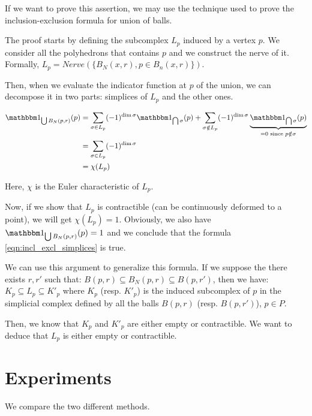 If we want to prove this assertion, we may use the technique used to prove the
inclusion-exclusion formula for union of balls.

The proof starts by defining the subcomplex $ L_p $ induced by a vertex $ p $.
We consider all the polyhedrons that contains $ p $ and we construct the nerve of
it. Formally, $ L_p = Nerve(\{ B_N(x, r), p \in B_n(x, r)\}) $.

Then, when we evaluate the indicator function at $ p $ of the union, we can
decompose it in two parts: simplices of $ L_p $ and the other ones.

\begin{align*}
    \indicator{\bigcup B_N(p, r)}(p) &= \sum_{\sigma \in L_p} (-1)^{\dim \sigma}
    \indicator{\bigcap \sigma}(p) + \sum_{\sigma \notin L_p} (-1)^{\dim \sigma}
    \underbrace{\indicator{\bigcap \sigma}(p)}_{= 0 \text{ since } p \notin
        \sigma} \\
    &= \sum_{\sigma \in L_p} (-1)^{\dim \sigma} \\
    &= \chi(L_p)
\end{align*}

Here, $ \chi $ is the Euler characteristic of $ L_p $.

Now, if we show that $ L_p $ is contractible (can be continuously deformed to a
point), we will get $ \chi(L_p) = 1 $. Obviously, we also have $
\indicator{\bigcup B_N(p, r)}(p) = 1 $ and we conclude that the formula
\ref{eqn:incl_excl_simplices} is true.

We can use this argument to generalize this formula. If we suppose the there
exists $ r, r' $ such that: $ B(p, r) \subseteq B_N(p, r) \subseteq B(p, r') $,
then we have: $ K_p \subseteq L_p \subseteq K'_p $ where $ K_p $ (resp. $ K'_p $)
is the induced subcomplex of $ p $ in the simplicial complex defined by all the
balls $ B(p, r) $ (resp. $ B(p, r') $), $ p \in P $.

Then, we know that $ K_p $ and $ K'_p $ are either empty or contractible. We
want to deduce that $ L_p $ is either empty or contractible.


\section{Experiments}


We compare the two different methods.


